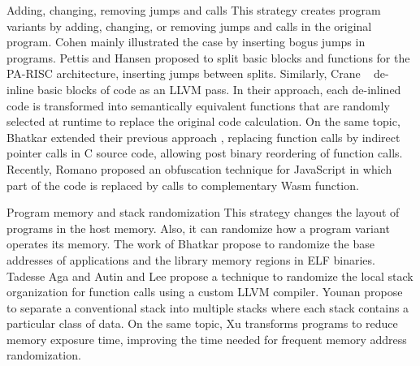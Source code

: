 \begin{strategy}{Adding, changing, removing jumps and calls}
    \label{strategy:S3}
    \normalfont
    This strategy creates program variants by adding, changing, or removing jumps and calls in the original program. Cohen \cite{cohen1993operating} mainly illustrated the case by inserting bogus jumps in programs. Pettis and Hansen \cite{pettisochhansen} proposed to split basic blocks and functions for the PA-RISC architecture, inserting jumps between splits.
    Similarly, Crane \etal~\cite{crane2015thwarting} de-inline basic blocks of code as an LLVM pass. In their approach, each de-inlined code is transformed into semantically equivalent functions that are randomly selected at runtime to replace the original code calculation. On the same topic, Bhatkar \etal \cite{bhatkar2005efficient} extended their previous approach \cite{bhatkar03}, replacing function calls by indirect pointer calls in C source code, allowing post binary reordering of function calls. Recently, Romano \etal \cite{wobfuscator} proposed an obfuscation technique for JavaScript in which part of the code is replaced by calls to complementary Wasm function.
\end{strategy}


\begin{strategy}{Program memory and stack randomization}
    \label{strategy:S4}
    \normalfont
    This strategy changes the layout of programs in the host memory. Also, it can randomize how a program variant operates its memory. The work of Bhatkar \etal \cite{bhatkar03, bhatkar2005efficient} propose to randomize the base addresses of applications and the library memory regions in ELF binaries. Tadesse Aga and Autin \cite{aga2019smokestack} and Lee \etal \cite{lee2021savior} propose a technique to randomize the local stack organization for function calls using a custom LLVM compiler.
    Younan \etal \cite{Younan2006} propose to separate a conventional stack into multiple stacks where each stack contains a particular class of
    data. 
    On the same topic, Xu \etal \cite{xu2020merr} transforms programs to reduce memory exposure time, improving the time needed for frequent memory address randomization. 
\end{strategy}


